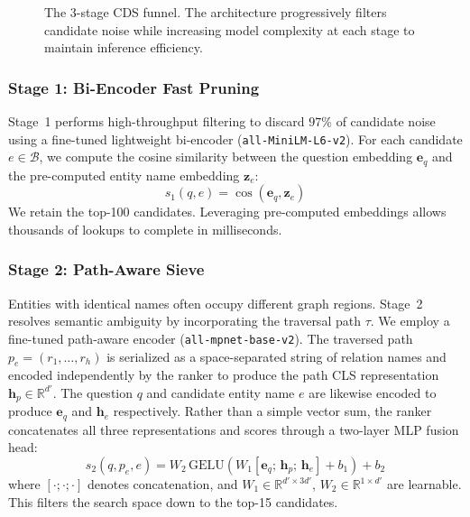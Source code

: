\documentclass[10pt,conference]{IEEEtran}
\begin{document}
\begin{figure}[htbp]
  \centering
  \resizebox{\columnwidth}{!}{}
  \caption{The 3-stage CDS funnel. The architecture progressively filters candidate noise while increasing model complexity at each stage to maintain inference efficiency.}
  \label{fig:cds_funnel}
\end{figure}

\subsubsection{Stage 1: Bi-Encoder Fast Pruning}
Stage~1 performs high-throughput filtering to discard $97\%$ of candidate noise using a fine-tuned lightweight bi-encoder (\texttt{all-MiniLM-L6-v2}). For each candidate $e \in \mathcal{B}$, we compute the cosine similarity between the question embedding $\mathbf{e}_q$ and the pre-computed entity name embedding $\mathbf{z}_e$:
\begin{equation}
    s_1(q, e) = \cos(\mathbf{e}_q, \mathbf{z}_e)
\end{equation}
We retain the top-100 candidates. Leveraging pre-computed embeddings allows thousands of lookups to complete in milliseconds.

\subsubsection{Stage 2: Path-Aware Sieve}
Entities with identical names often occupy different graph regions. Stage~2 resolves semantic ambiguity by incorporating the traversal path $\tau$. We employ a fine-tuned path-aware encoder (\texttt{all-mpnet-base-v2}). The traversed path $p_e = (r_1, \dots, r_h)$ is serialized as a space-separated string of relation names and encoded independently by the ranker to produce the path CLS representation $\mathbf{h}_p \in \mathbb{R}^{d'}$. The question $q$ and candidate entity name $e$ are likewise encoded to produce $\mathbf{e}_q$ and $\mathbf{h}_e$ respectively. Rather than a simple vector sum, the ranker concatenates all three representations and scores through a two-layer MLP fusion head:
\begin{equation}
    s_2(q, p_e, e) = W_2\,\text{GELU}(W_1[\mathbf{e}_q;\,\mathbf{h}_p;\,\mathbf{h}_e] + b_1) + b_2
\end{equation}
where $[\cdot;\cdot;\cdot]$ denotes concatenation, and $W_1 \in \mathbb{R}^{d' \times 3d'}$, $W_2 \in \mathbb{R}^{1 \times d'}$ are learnable. This filters the search space down to the top-15 candidates.
\end{document}
